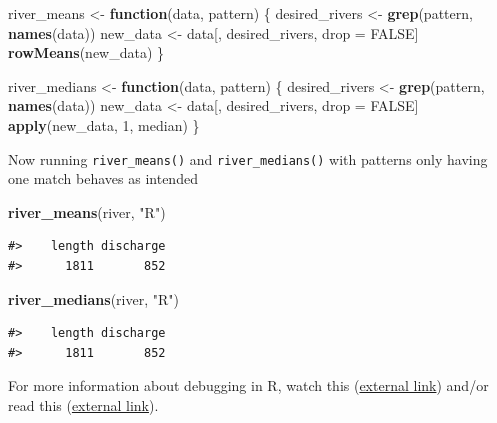 \documentclass[
]{book}
\newenvironment{Shaded}{\begin{snugshade}}{\end{snugshade}}
\newcommand{\ControlFlowTok}[1]{\textcolor[rgb]{0.13,0.29,0.53}{\textbf{#1}}}
\newcommand{\DecValTok}[1]{\textcolor[rgb]{0.00,0.00,0.81}{#1}}
\newcommand{\KeywordTok}[1]{\textcolor[rgb]{0.13,0.29,0.53}{\textbf{#1}}}
\newcommand{\NormalTok}[1]{#1}
\newcommand{\OtherTok}[1]{\textcolor[rgb]{0.56,0.35,0.01}{#1}}
\newcommand{\StringTok}[1]{\textcolor[rgb]{0.31,0.60,0.02}{#1}}
\begin{document}
\begin{Shaded}
\begin{Highlighting}[]
\NormalTok{river_means <-}\StringTok{ }\ControlFlowTok{function}\NormalTok{(data, pattern) \{}
\NormalTok{  desired_rivers <-}\StringTok{ }\KeywordTok{grep}\NormalTok{(pattern, }\KeywordTok{names}\NormalTok{(data))}
\NormalTok{  new_data <-}\StringTok{ }\NormalTok{data[, desired_rivers, drop =}\StringTok{ }\OtherTok{FALSE}\NormalTok{]}
  \KeywordTok{rowMeans}\NormalTok{(new_data)}
\NormalTok{\}}

\NormalTok{river_medians <-}\StringTok{ }\ControlFlowTok{function}\NormalTok{(data, pattern) \{}
\NormalTok{  desired_rivers <-}\StringTok{ }\KeywordTok{grep}\NormalTok{(pattern, }\KeywordTok{names}\NormalTok{(data))}
\NormalTok{  new_data <-}\StringTok{ }\NormalTok{data[, desired_rivers, drop =}\StringTok{ }\OtherTok{FALSE}\NormalTok{]}
  \KeywordTok{apply}\NormalTok{(new_data, }\DecValTok{1}\NormalTok{, median)}
\NormalTok{\}}
\end{Highlighting}
\end{Shaded}

Now running \texttt{river\_means()} and \texttt{river\_medians()} with patterns only having one match behaves as intended

\begin{Shaded}
\begin{Highlighting}[]
\KeywordTok{river_means}\NormalTok{(river, }\StringTok{"R"}\NormalTok{)}
\end{Highlighting}
\end{Shaded}

\begin{verbatim}
#>    length discharge 
#>      1811       852
\end{verbatim}

\begin{Shaded}
\begin{Highlighting}[]
\KeywordTok{river_medians}\NormalTok{(river, }\StringTok{"R"}\NormalTok{)}
\end{Highlighting}
\end{Shaded}

\begin{verbatim}
#>    length discharge 
#>      1811       852
\end{verbatim}

For more information about debugging in R, watch this (\href{https://www.rstudio.com/resources/rstudioconf-2020/object-of-type-closure-is-not-subsettable/}{external link}) and/or read this (\href{https://adv-r.hadley.nz/debugging.html}{external link}).
\end{document}

